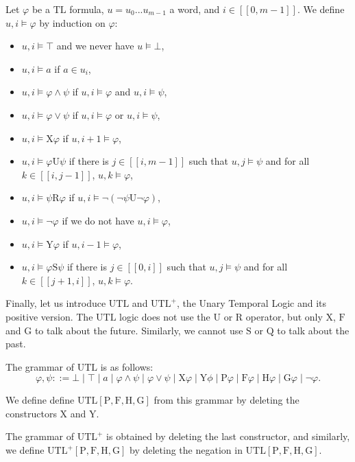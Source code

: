 \documentclass[a4paper,UKenglish,cleveref, autoref, thm-restate]{lipics-v2021}
\newcommand{\TL}{\mathrm{TL}}
\newcommand{\UTL}{\mathrm{UTL}}
\newcommand{\UTLp}{\UTL^+}
\newcommand{\X}{\mathrm{X}}
\newcommand{\Y}{\mathrm{Y}}
\newcommand{\U}{\mathrm{U}}
\renewcommand{\S}{\mathrm{S}}
\newcommand{\Q}{\mathrm{Q}}
\newcommand{\R}{\mathrm{R}}
\renewcommand{\P}{\mathrm{P}}
\newcommand{\F}{\mathrm{F}}
\renewcommand{\H}{\mathrm{H}}
\newcommand{\G}{\mathrm{G}}
\begin{document}
\begin{definition}
    Let $\varphi$ be a $\TL$ formula, $u = u_0...u_{m-1}$  a word, and $i\in[\![0,m-1]\!]$. We define $u,i \models \varphi$ by induction on $\varphi$:
    \begin{itemize}
        \item $u,i \models \top$ and we never have $u \models \bot$,
        \item $u,i \models a$ if $a \in u_i$,
        \item $u,i \models \varphi \land \psi$ if $u,i \models \varphi$ and $u,i \models \psi$,
        \item $u,i \models \varphi \lor \psi$ if $u,i \models \varphi$ or $u,i \models \psi$,
        \item $u,i \models \X \varphi$ if $u, i+1 \models \varphi$,
        \item $u,i \models \varphi \U \psi$ if there is $j\in[\![i,m-1]\!]$ such that $u,j \models \psi$ and for all $k\in[\![i,j-1]\!]$, $u,k \models \varphi$,
        \item $u,i \models \psi \R \varphi$ if $u,i \models \neg (\neg \psi \U \neg \varphi)$,
        \item $u,i \models \neg \varphi$ if we do not have $u,i \models \varphi$,
        \item $u,i \models \Y \varphi$ if $u,i-1 \models \varphi$,
        \item $u,i \models \varphi \S \psi$ if there is $j\in[\![0,i]\!]$ such that $u,j \models \psi$ and for all $k\in[\![j+1,i]\!]$, $u,k \models \varphi$.
    \end{itemize}
\end{definition}





Finally, let us introduce $\UTL$ and $\UTLp$, the Unary Temporal Logic and its positive version. The $\UTL$ logic does not use the $\U$ or $\R$ operator, but only $\X$, $\F$ and $\G$ to talk about the future. Similarly, we cannot use $\S$ or $\Q$ to talk about the past.


\begin{definition}
    The grammar of $\UTL$ is as follows:
     $$
    \varphi, \psi::= \bot \mid \top \mid a \mid \varphi \land \psi \mid \varphi \lor \psi \mid \X \varphi \mid \Y \phi \mid \P \varphi \mid \F \varphi \mid \H \varphi \mid \G \varphi \mid \neg \varphi .
    $$




    We define define $\UTL[\P,\F,\H,\G]$ from this grammar by deleting the constructors $\X$ and $\Y$.



    The grammar of $\UTLp$ is obtained by deleting the last constructor, and similarly, we define $\UTLp[\P,\F,\H,\G]$ by deleting the negation in $\UTL[\P,\F,\H,\G]$.
\end{definition}
\end{document}
